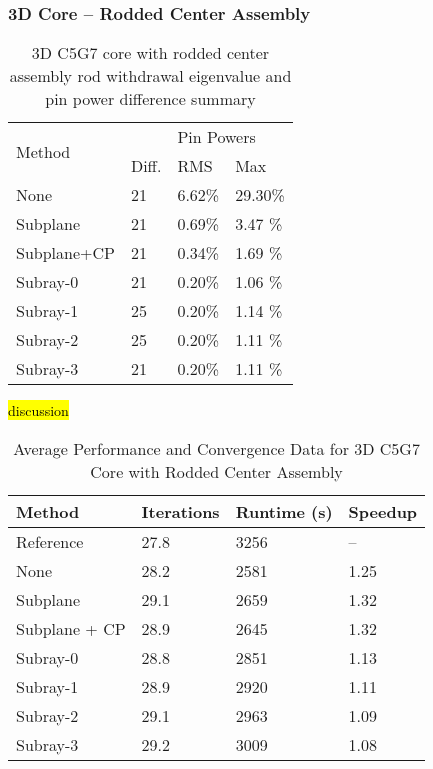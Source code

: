 \subsubsection{3D Core -- Rodded Center Assembly}

\begin{table}
    \centering
    \caption[3D C5G7 Core with Rodded Center Assembly Results]{3D C5G7 core with rodded center assembly rod withdrawal eigenvalue and pin power difference summary}\label{t:c5g7-3d-core-center}
    \begin{tabular}{l l l l}\toprule
        \multirow{2}{*}{Method} & \keff{} & \multicolumn{2}{l}{Pin Powers} \\
        & Diff. & RMS & Max \\\midrule
None        & 21 & 6.62\% & 29.30\% \\
Subplane    & 21 & 0.69\% & 3.47 \% \\
Subplane+CP & 21 & 0.34\% & 1.69 \% \\
Subray-0    & 21 & 0.20\% & 1.06 \% \\
Subray-1    & 25 & 0.20\% & 1.14 \% \\
Subray-2    & 25 & 0.20\% & 1.11 \% \\
Subray-3    & 21 & 0.20\% & 1.11 \% \\
        \bottomrule
    \end{tabular}
\end{table}

\hl{discussion}

\begin{table}[h]
    \centering
    \caption[3D C5G7 Core with Rodded Center Assembly Performance]{Average Performance and Convergence Data for 3D C5G7 Core with Rodded Center  Assembly}\label{t:subray-performance-3Dcore-center}
    \begin{tabular}{l l l l}\toprule
        Method & Iterations & Runtime (s) & Speedup \\\midrule
        Reference     & 27.8 & 3256 & -- \\
        None          & 28.2 & 2581 & 1.25 \\
        Subplane      & 29.1 & 2659 & 1.32 \\
        Subplane + CP & 28.9 & 2645 & 1.32 \\
        Subray-0      & 28.8 & 2851 & 1.13 \\
        Subray-1      & 28.9 & 2920 & 1.11 \\
        Subray-2      & 29.1 & 2963 & 1.09 \\
        Subray-3      & 29.2 & 3009 & 1.08 \\
        \bottomrule
    \end{tabular}
\end{table}

